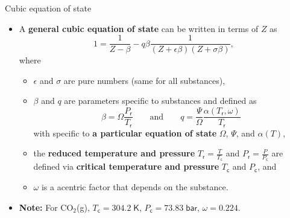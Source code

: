 \begin{frame}{Cubic equation of state}

\begin{itemize}
\item A \alert{\textbf{general cubic equation of state}} can be written in terms
of $Z$ \citep{Smith2005} as
\[
\boxed{1=\frac{1}{Z-\beta}-q\beta\frac{1}{(Z+\epsilon\beta)(Z+\sigma\beta)}},
\]
where  
\begin{itemize}
\item $\epsilon$ and $\sigma$ are pure numbers (same for all substances),  
\item $\beta$ and $q$ are  parameters specific to substances and defined as
\[
\beta=\Omega\frac{P_{\mathsf{r}}}{T_{\mathsf{r}}} \qquad \mbox{and} \qquad
q=\frac{\Psi}{\Omega}\frac{\alpha(T_{\mathsf{r}},\omega)}{T_{\mathsf{r}}}
\]
%
with specific to \textbf{a particular equation of state} $\Omega$, $\Psi$, and $\alpha(T)$, 
\item the \textbf{reduced temperature and pressure} $T_{\mathsf{r}} = \frac{T}{T_{\mathsf{c}}}$ and
$P_{\mathsf{r}} = \frac{P}{P_{\mathsf{c}}}$ are defined via \textbf{critical temperature and pressure} 
$T_{\mathsf{c}}$ and $P_{\mathsf{c}}$, and 
\item $\omega$ is a \alert{acentric factor} that depends on the substance.
\end{itemize}
%
\item \textbf{Note:} For CO$_{2}$(g), ${T_{\mathsf{c}}=304.2\;\mathsf{K}}$, ${P_{\mathsf{c}}=73.83\;\mathsf{bar}}$,
${\omega=0.224}$. 
\end{itemize}

\end{frame}
%
